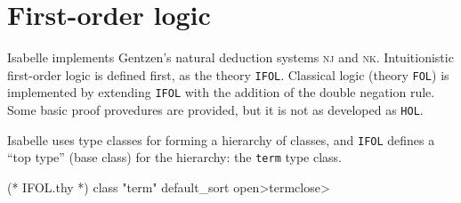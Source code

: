 \section{First-order logic}

\begin{node}\label{isabelle:fol-0000}%
Isabelle implements Gentzen's natural deduction systems \textsc{nj} and
\textsc{nk}. Intuitionistic first-order logic is defined first, as the
theory \texttt{IFOL}. Classical logic (theory \texttt{FOL}) is
implemented by extending \texttt{IFOL} with the addition of the double
negation rule. Some basic proof provedures are provided, but it is not
as developed as \texttt{HOL}.
\end{node}

\begin{node}[Terms]\label{isabelle:fol-0003}%
Isabelle uses type classes for forming a hierarchy of classes, and
\texttt{IFOL} defines a ``top type'' (base class) for the
hierarchy: the \texttt{term} type class.
\begin{Isabelle}
(* IFOL.thy *)
class "term"
default_sort \<open>term\<close>
\end{Isabelle}
\end{node}

